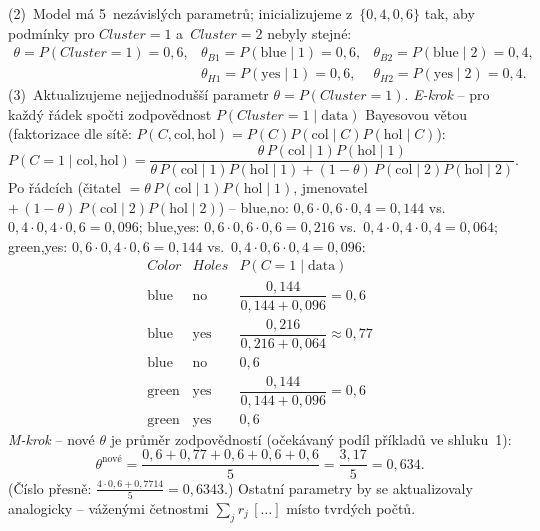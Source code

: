 \begin{priklad}
(2)~Model má 5~nezávislých parametrů; inicializujeme z~$\{0{,}4,0{,}6\}$ tak, aby podmínky pro $\mathit{Cluster}{=}1$ a~$\mathit{Cluster}{=}2$ nebyly stejné:
\[
\begin{array}{llc}
\theta=P(\mathit{Cluster}{=}1)=0{,}6, &
\theta_{B1}=P(\text{blue}\mid 1)=0{,}6, & \theta_{B2}=P(\text{blue}\mid 2)=0{,}4,\\
& \theta_{H1}=P(\text{yes}\mid 1)=0{,}6, & \theta_{H2}=P(\text{yes}\mid 2)=0{,}4.
\end{array}
\]
(3)~Aktualizujeme nejjednodušší parametr $\theta=P(\mathit{Cluster}{=}1)$. \emph{E-krok} -- pro každý řádek spočti zodpovědnost $P(\mathit{Cluster}{=}1\mid\text{data})$ Bayesovou větou (faktorizace dle sítě: $P(C,\text{col},\text{hol})=P(C)P(\text{col}\mid C)P(\text{hol}\mid C)$):
\[
P(C{=}1\mid \text{col},\text{hol})=\frac{\theta\,P(\text{col}\mid1)P(\text{hol}\mid1)}{\theta\,P(\text{col}\mid1)P(\text{hol}\mid1)+(1-\theta)\,P(\text{col}\mid2)P(\text{hol}\mid2)} .
\]
Po řádcích (čitatel $=\theta\,P(\text{col}\mid1)P(\text{hol}\mid1)$, jmenovatel $+\,(1-\theta)\,P(\text{col}\mid2)P(\text{hol}\mid2)$) -- blue,no: $0{,}6\cdot0{,}6\cdot0{,}4=0{,}144$ vs.\ $0{,}4\cdot0{,}4\cdot0{,}6=0{,}096$; blue,yes: $0{,}6\cdot0{,}6\cdot0{,}6=0{,}216$ vs.\ $0{,}4\cdot0{,}4\cdot0{,}4=0{,}064$; green,yes: $0{,}6\cdot0{,}4\cdot0{,}6=0{,}144$ vs.\ $0{,}4\cdot0{,}6\cdot0{,}4=0{,}096$:
\[
\begin{array}{c|c|c}
\mathit{Color} & \mathit{Holes} & P(C{=}1\mid\text{data})\\\hline
\text{blue} & \text{no} & \dfrac{0{,}144}{0{,}144+0{,}096}=0{,}6\\[4pt]
\text{blue} & \text{yes} & \dfrac{0{,}216}{0{,}216+0{,}064}\approx0{,}77\\[4pt]
\text{blue} & \text{no} & 0{,}6\\[2pt]
\text{green} & \text{yes} & \dfrac{0{,}144}{0{,}144+0{,}096}=0{,}6\\[4pt]
\text{green} & \text{yes} & 0{,}6
\end{array}
\]
\emph{M-krok} -- nové $\theta$ je průměr zodpovědností (očekávaný podíl příkladů ve shluku~1):
\[
  \theta^{\text{nové}}=\frac{0{,}6+0{,}77+0{,}6+0{,}6+0{,}6}{5}=\frac{3{,}17}{5}=\boxed{0{,}634}.
\]
(Číslo přesně: $\tfrac{4\cdot0{,}6+0{,}7714}{5}=0{,}6343$.) Ostatní parametry by se aktualizovaly analogicky -- váženými četnostmi $\sum_j r_{j}\,[\dots]$ místo tvrdých počtů.
\end{priklad}

